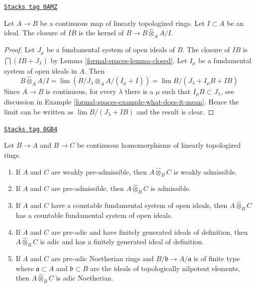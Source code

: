 \begin{lemma}
\label{formal-spaces-lemma-closure-image-ideal}
\href{https://stacks.math.columbia.edu/tag/0AMZ}{\texttt{Stacks tag 0AMZ}}

Let $A \to B$ be a continuous map of linearly topologized rings.
Let $I \subset A$ be an ideal. The closure of $IB$
is the kernel of $B \to B \widehat{\otimes}_A A/I$.
\end{lemma}

\begin{proof}
Let $J_\mu$ be a fundamental system of open ideals of $B$.
The closure of $IB$ is $\bigcap (IB + J_\lambda)$ by Lemma \ref{formal-spaces-lemma-closed}.
Let $I_\mu$ be a fundamental system of open ideals in $A$.
Then
$$
B \widehat{\otimes}_A A/I = \lim (B/J_\lambda \otimes_A A/(I_\mu + I)) =
\lim B/(J_\lambda + I_\mu B + I B)
$$
Since $A \to B$ is continuous, for every $\lambda$ there
is a $\mu$ such that $I_\mu B \subset J_\lambda$, see discussion in
Example \ref{formal-spaces-example-what-does-it-mean}. Hence the limit
can be written as $\lim B/(J_\lambda + IB)$ and the result is clear.
\end{proof}

\begin{lemma}
\label{formal-spaces-lemma-completed-tensor-product}
\href{https://stacks.math.columbia.edu/tag/0GB4}{\texttt{Stacks tag 0GB4}}

Let $B \to A$ and $B \to C$ be continuous homomorphisms of
linearly topologized rings.
\begin{enumerate}
\item If $A$ and $C$ are weakly pre-admissible, then
$A \widehat{\otimes}_B C$ is weakly admissible.
\item If $A$ and $C$ are pre-admissible, then
$A \widehat{\otimes}_B C$ is admissible.
\item If $A$ and $C$ have a countable fundamental system of open
ideals, then $A \widehat{\otimes}_B C$ has a countable fundamental
system of open ideals.
\item If $A$ and $C$ are pre-adic and have finitely generated ideals
of definition, then $A \widehat{\otimes}_B C$ is adic and has
a finitely generated ideal of definition.
\item If $A$ and $C$ are pre-adic Noetherian rings and
$B/\mathfrak b \to A/\mathfrak a$ is of finite type
where $\mathfrak a \subset A$ and $\mathfrak b \subset B$
are the ideals of topologically nilpotent elements, then
$A \widehat{\otimes}_B C$ is adic Noetherian.
\end{enumerate}
\end{lemma}

